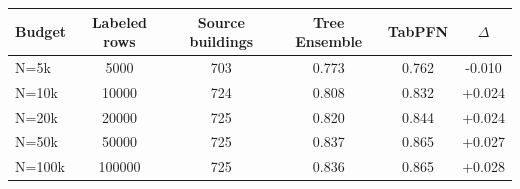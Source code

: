 \documentclass[10pt]{article}
\begin{document}
\begin{preview}\begin{minipage}{\linewidth}
\centering
{}
\label{tab:m5-exp-a-results}
\begin{tabular}{lS[table-format=6.0]S[table-format=3.0]S[table-format=1.3]S[table-format=1.3]S[table-format=+1.3]}
\toprule
Budget & {Labeled rows} & {Source buildings} & {Tree Ensemble} & {TabPFN} & {$\Delta$} \\
\midrule
N=5k & 5000 & 703 & 0.773 & 0.762 & -0.010 \\
N=10k & 10000 & 724 & 0.808 & 0.832 & +0.024 \\
N=20k & 20000 & 725 & 0.820 & 0.844 & +0.024 \\
N=50k & 50000 & 725 & 0.837 & 0.865 & +0.027 \\
N=100k & 100000 & 725 & 0.836 & 0.865 & +0.028 \\
\bottomrule
\end{tabular}
\end{minipage}\end{preview}
\end{document}
